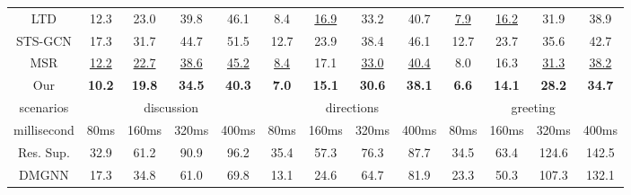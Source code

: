 \begin{table}[t]
{\begin{tabular}{c|cccc|cccc|cccc}
    LTD         & 12.3          & 23.0          & 39.8          & 46.1          & 8.4           & \underline{16.9}    & 33.2          & 40.7          & \underline{7.9}     & \underline{16.2}    & 31.9          & 38.9          \\
    STS-GCN      & 17.3          & 31.7          & 44.7          & 51.5          & 12.7          & 23.9          & 38.4          & 46.1          & 12.7          & 23.7          & 35.6          & 42.7          \\
    MSR         & \underline{12.2}    & \underline{22.7}    & \underline{38.6}    & \underline{45.2}    & \underline{8.4}     & 17.1          & \underline{33.0}    & \underline{40.4}    & 8.0           & 16.3          & \underline{31.3}    & \underline{38.2}    \\
    Our         & \textbf{10.2} & \textbf{19.8} & \textbf{34.5} & \textbf{40.3} & \textbf{7.0}  & \textbf{15.1} & \textbf{30.6} & \textbf{38.1} & \textbf{6.6}  & \textbf{14.1} & \textbf{28.2} & \textbf{34.7} \\ \hline
    scenarios   & \multicolumn{4}{c|}{discussion}                                & \multicolumn{4}{c|}{directions}                                & \multicolumn{4}{c}{greeting}                                  \\ \hline
    millisecond & 80ms          & 160ms         & 320ms         & 400ms         & 80ms          & 160ms         & 320ms         & 400ms         & 80ms          & 160ms         & 320ms         & 400ms         \\ \hline
    Res. Sup.   & 32.9          & 61.2          & 90.9          & 96.2          & 35.4          & 57.3          & 76.3          & 87.7          & 34.5          & 63.4          & 124.6         & 142.5         \\
    DMGNN       & 17.3          & 34.8          & 61.0          & 69.8          & 13.1          & 24.6          & 64.7          & 81.9          & 23.3          & 50.3          & 107.3         & 132.1         \\
    

\end{tabular}}
\end{table}
